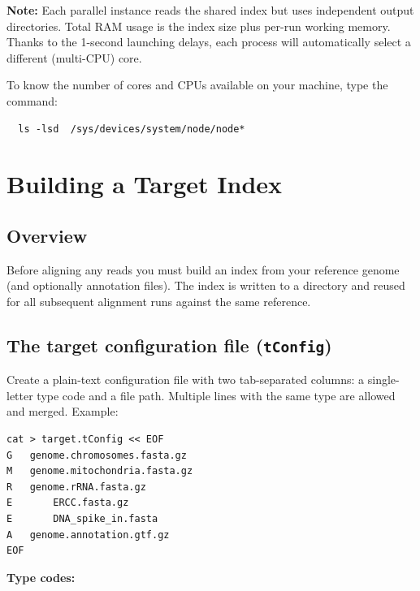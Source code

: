 \documentclass[11pt]{article}
\newcommand{\code}[1]{\texttt{#1}}
\begin{document}
\begin{notebox}
\textbf{Note:} Each parallel instance reads the shared index but uses
independent output directories.  Total RAM usage is the index size plus
per-run working memory.
Thanks to the 1-second launching delays, each process will
automatically select a different (multi-CPU) core.

To know the number of cores and CPUs available on your machine, type the
command:

\begin{lstlisting}
  ls -lsd  /sys/devices/system/node/node*
\end{lstlisting}
\end{notebox}

\section{Building a Target Index}

\subsection{Overview}
\label{sec:targetIndex}

Before aligning any reads you must
build an index from your reference genome (and optionally annotation
files).  The index is written to a directory and reused for all subsequent
alignment runs against the same reference.

\subsection{The target configuration file (\code{tConfig})}

Create a plain-text configuration file with two tab-separated columns:
a single-letter type code and a file path.  Multiple lines with the
same type are allowed and merged. Example:

\begin{lstlisting}
cat > target.tConfig << EOF
G	genome.chromosomes.fasta.gz
M	genome.mitochondria.fasta.gz
R	genome.rRNA.fasta.gz
E       ERCC.fasta.gz
E       DNA_spike_in.fasta
A	genome.annotation.gtf.gz
EOF
\end{lstlisting}

\textbf{Type codes:}
\end{document}
